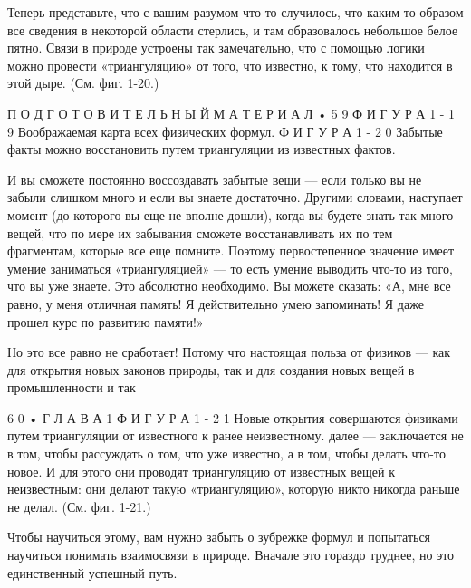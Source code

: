 \documentclass[10pt,oneside]{article}
\begin{document}
Теперь представьте, что с вашим разумом что-то случилось, что каким-то образом все сведения в некоторой области стерлись, и там образовалось небольшое белое пятно. Связи в природе устроены так замечательно, что с помощью логики можно провести «триангуляцию» от того, что известно, к тому, что находится в этой дыре. (См. фиг. 1-20.)\par

П О Д Г О Т О В И Т Е Л Ь Н Ы Й  М А Т Е Р И А Л • 5 9 Ф И Г У Р А  1 - 1 9 Воображаемая карта всех физических формул. Ф И Г У Р А  1 - 2 0 Забытые факты можно восстановить путем триангуляции из известных фактов.\par

И вы сможете постоянно воссоздавать забытые вещи --- если только вы не забыли слишком много и если вы знаете достаточно. Другими словами, наступает момент (до которого вы еще не вполне дошли), когда вы будете знать так много вещей, что по мере их забывания сможете восстанавливать их по тем фрагментам, которые все еще помните. Поэтому первостепенное значение имеет умение заниматься «триангуляцией» --- то есть умение выводить что-то из того, что вы уже знаете. Это абсолютно необходимо. Вы можете сказать: «А, мне все равно, у меня отличная память! Я действительно умею запоминать! Я даже прошел курс по развитию памяти!»\par

Но это все равно не сработает! Потому что настоящая польза от физиков --- как для открытия новых законов природы, так и для создания новых вещей в промышленности и так\par

6 0 • Г Л А В А  1 Ф И Г У Р А  1 - 2 1 Новые открытия совершаются физиками путем триангуляции от известного к ранее неизвестному. далее --- заключается не в том, чтобы рассуждать о том, что уже известно, а в том, чтобы делать что-то новое. И для этого они проводят триангуляцию от известных вещей к неизвестным: они делают такую «триангуляцию», которую никто никогда раньше не делал. (См. фиг. 1-21.)\par

Чтобы научиться этому, вам нужно забыть о зубрежке формул и попытаться научиться понимать взаимосвязи в природе. Вначале это гораздо труднее, но это единственный успешный путь.\par

\clearpage
{}
\end{document}
